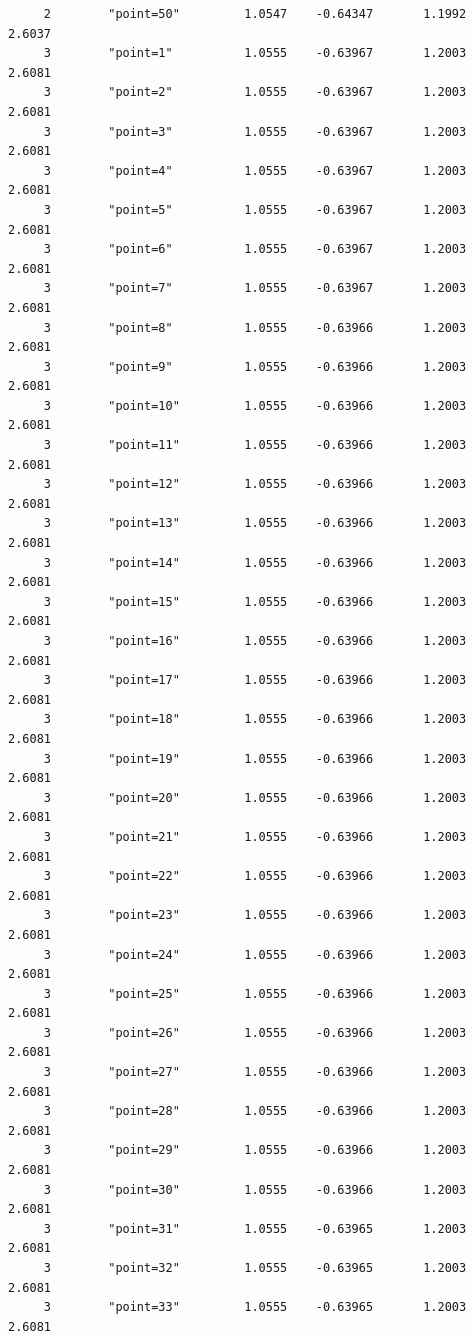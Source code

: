 \documentclass[
]{book}
\begin{document}
\begin{verbatim}
     2        "point=50"         1.0547    -0.64347       1.1992      2.6037
     3        "point=1"          1.0555    -0.63967       1.2003      2.6081
     3        "point=2"          1.0555    -0.63967       1.2003      2.6081
     3        "point=3"          1.0555    -0.63967       1.2003      2.6081
     3        "point=4"          1.0555    -0.63967       1.2003      2.6081
     3        "point=5"          1.0555    -0.63967       1.2003      2.6081
     3        "point=6"          1.0555    -0.63967       1.2003      2.6081
     3        "point=7"          1.0555    -0.63967       1.2003      2.6081
     3        "point=8"          1.0555    -0.63966       1.2003      2.6081
     3        "point=9"          1.0555    -0.63966       1.2003      2.6081
     3        "point=10"         1.0555    -0.63966       1.2003      2.6081
     3        "point=11"         1.0555    -0.63966       1.2003      2.6081
     3        "point=12"         1.0555    -0.63966       1.2003      2.6081
     3        "point=13"         1.0555    -0.63966       1.2003      2.6081
     3        "point=14"         1.0555    -0.63966       1.2003      2.6081
     3        "point=15"         1.0555    -0.63966       1.2003      2.6081
     3        "point=16"         1.0555    -0.63966       1.2003      2.6081
     3        "point=17"         1.0555    -0.63966       1.2003      2.6081
     3        "point=18"         1.0555    -0.63966       1.2003      2.6081
     3        "point=19"         1.0555    -0.63966       1.2003      2.6081
     3        "point=20"         1.0555    -0.63966       1.2003      2.6081
     3        "point=21"         1.0555    -0.63966       1.2003      2.6081
     3        "point=22"         1.0555    -0.63966       1.2003      2.6081
     3        "point=23"         1.0555    -0.63966       1.2003      2.6081
     3        "point=24"         1.0555    -0.63966       1.2003      2.6081
     3        "point=25"         1.0555    -0.63966       1.2003      2.6081
     3        "point=26"         1.0555    -0.63966       1.2003      2.6081
     3        "point=27"         1.0555    -0.63966       1.2003      2.6081
     3        "point=28"         1.0555    -0.63966       1.2003      2.6081
     3        "point=29"         1.0555    -0.63966       1.2003      2.6081
     3        "point=30"         1.0555    -0.63966       1.2003      2.6081
     3        "point=31"         1.0555    -0.63965       1.2003      2.6081
     3        "point=32"         1.0555    -0.63965       1.2003      2.6081
     3        "point=33"         1.0555    -0.63965       1.2003      2.6081

\end{verbatim}
\end{document}
